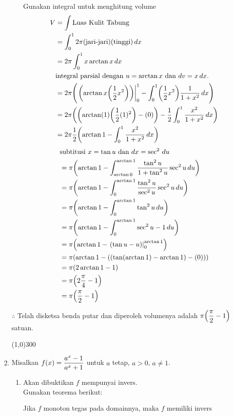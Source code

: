 \begin{enumerate}[leftmargin=*, label={\arabic*}.]
\begin{enumerate}[label={\alph*}.]
    Gunakan integral untuk menghitung volume
    \begin{align*}
        V &= \int \text{Luas Kulit Tabung}\\
        &=\int_{0}^{1} 2\pi(\text{jari-jari})(\text{tinggi})\,dx\\
        &=2\pi\int_{0}^{1} x\arctan x\,dx\\
        &\text{integral parsial dengan $u=\arctan x$ dan $dv=x\,dx$.}\\
        &=2\pi\brk*{\eval{\arctan x\brk*{\frac{1}{2}x^{2}}}{0}{1}
        -\int_{0}^{1}\brk*{\frac{1}{2}x^{2}}\frac{1}{1+x^{2}}\,dx}\\
        &=2\pi\brk*{\brk*{{\arctan (1)\brk*{\frac{1}{2}(1)^{2}}}-(0)}
        -\frac{1}{2}\int_{0}^{1}\frac{x^{2}}{1+x^{2}}\,dx}\\
        &=2\pi\frac{1}{2}\brk*{\arctan 1-\int_{0}^{1}\frac{x^{2}}{1+x^{2}}\,dx}\\
    \end{align*}
    \begin{align*}
        &\text{subtitusi $x=\tan u$ dan $dx=\sec^{2}\,du$}\\
        &=\pi\brk*{\arctan 1
        -\int_{\arctan 0}^{\arctan 1}\frac{\tan^{2}u}{1+\tan^{2}u}\sec^{2}u\,du}\\
        &=\pi\brk*{\arctan 1-\int_{0}^{\arctan 1}\frac{\tan^{2}u}{\sec^{2}u}\sec^{2}u\,du}\\
        &=\pi\brk*{\arctan 1-\int_{0}^{\arctan 1}\tan^{2}u\,du}\\
        &=\pi\brk*{\arctan 1-\int_{0}^{\arctan 1}\sec^{2}u-1\,du}\\
        &=\pi\brk*{\arctan 1-\eval{\tan u-u}{0}{\arctan 1}}\\
        &=\pi\brk*{\arctan 1-((\tan(\arctan 1)-\arctan 1)-(0))}\\
        &=\pi\brk*{2\arctan 1-1}\\
        &=\pi\brk*{2\frac{\pi}{4}-1}\\
        &=\pi\brk*{\frac{\pi}{2}-1}\\
    \end{align*}
\end{enumerate}

$\therefore$ Telah disketsa benda putar dan diperoleh volumenya adalah 
$\ds \pi\brk*{\frac{\pi}{2}-1}$ satuan.
\begin{center}
    \line(1,0){300}
\end{center}
    
    \item Misalkan $\displaystyle f(x)=\frac{a^{x}-1}{a^{x}+1}$ untuk $a$ tetap, $a>0$, $a\neq 1$.
    \begin{enumerate}[label={\alph*}.]
        \item Akan dibuktikan $f$ mempunyai invers.\\
        Gunakan teorema berikut:
        \begin{theorem*}
            Jika $f$ monoton tegas pada domainnya, maka $f$ memiliki invers
        \end{theorem*}


\end{enumerate}
\end{enumerate}
